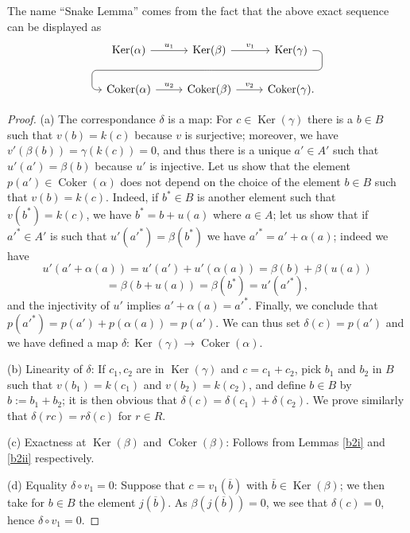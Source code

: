 \documentclass[parskip=half,fontsize=12pt]{scrartcl}%
\newcommand{\oo}{\operatorname}\newcommand{\ooo}{\operatorname*}
\newcommand{\Ker}{\operatorname{Ker}}\newcommand{\Coker}{\operatorname{Coker}}
\begin{document}
The name ``Snake Lemma'' comes from the fact that the above exact sequence can be displayed as 
$$%
\begin{tikzcd}
  \Ker(\alpha) \ar["u_1"]{r} & \Ker(\beta) \ar["v_1"]{r}
             \ar[draw=none]{d}[name=X, anchor=center]{}
    & \Ker(\gamma) \ar[rounded corners,
            to path={ -- ([xshift=2ex]\tikztostart.east)
                      |- (X.center) \tikztonodes
                      -| ([xshift=-2ex]\tikztotarget.west)
                      -- (\tikztotarget)}]{dll}[at end]{} \\      
  \Coker(\alpha) \ar["u_2"]{r} & \Coker(\beta) \ar["v_2"]{r} & \Coker(\gamma).
\end{tikzcd}
$$

\begin{proof} (a) The correspondance $\delta$ is a map: For $c\in\oo{Ker}(\gamma)$ there is a $b\in B$ such that $v(b)=k(c)$ because $v$ is surjective; moreover, we have $v'(\beta(b))=\gamma(k(c))=0$, and thus there is a unique $a'\in A'$ such that $u'(a')=\beta(b)$ because $u'$ is injective. Let us show that the element $p(a')\in\oo{Coker}(\alpha)$ does not depend on the choice of the element $b\in B$ such that $v(b)=k(c)$. Indeed, if $b^*\in B$ is another element such that $v(b^*)=k(c)$, we have $b^*=b+u(a)$ where $a\in A$; let us show that if $a'^*\in A'$ is such that $u'(a'^*)=\beta(b^*)$ we have $a'^*=a'+\alpha(a)$; indeed we have 
$$
u'(a'+\alpha(a))=u'(a')+u'(\alpha(a))=\beta(b)+\beta(u(a))
$$ 
$$
=\beta(b+u(a))=\beta(b^*)=u'(a'^*),
$$ 
and the injectivity of $u'$ implies $a'+\alpha(a)=a'^*$. Finally, we conclude that $p(a'^*)=p(a')+p(\alpha(a))=p(a')$. We can thus set $\delta(c)=p(a')$ and we have defined a map $\delta:\oo{Ker}(\gamma)\to\oo{Coker}(\alpha)$.

(b) Linearity of $\delta$: If $c_1,c_2$ are in $\oo{Ker}(\gamma)$ and $c=c_1+c_2$, pick $b_1$ and $b_2$ in $B$ such that $v(b_1)=k(c_1)$ and $v(b_2)=k(c_2)$, and define $b\in B$ by $b:=b_1+b_2$; it is then obvious that $\delta(c)=\delta(c_1)+\delta(c_2)$. We prove similarly that $\delta(rc)=r\delta(c)$ for $r\in R$.

(c) Exactness at $\oo{Ker}(\beta)$ and $\oo{Coker}(\beta)$: Follows from Lemmas \ref{b2i} and \ref{b2ii} respectively.

(d) Equality $\delta\circ v_1=0$: Suppose that $c=v_1(\overline b)$ with $\overline b\in\oo{Ker}(\beta)$; we then take for $b\in B$ the element $j(\overline b)$. As $\beta(j(\overline b))=0$, we see that $\delta(c)=0$, hence $\delta\circ v_1=0$. 


\end{proof}
\end{document}

